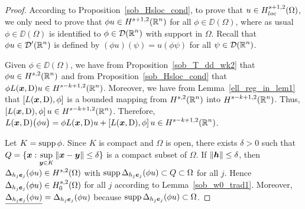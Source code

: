\begin{proof}
According to Proposition~\ref{sob_Hsloc_cond}, to prove that
$\displaystyle u \in H^{s+1,2}_{loc}(\Omega)$, we only need to prove that
$\displaystyle \phi u \in H^{s+1,2}(\mathbb{R}^n)$ for all $\phi\in \DD(\Omega)$,
where as usual $\phi \in \DD(\Omega)$ is identified to
$\displaystyle \phi \in \mathcal{D}(\mathbb{R}^n)$ with
support in $\Omega$.  Recall that $\displaystyle \phi  u \in \mathcal{D}'(\mathbb{R}^n)$ is
defined by $(\phi u)(\psi) = u(\phi \psi)$ for all
$\displaystyle \psi \in \mathcal{D}(\mathbb{R}^n)$.

Given $\phi \in \DD(\Omega)$, we have from
Proposition~\ref{sob_T_dd_wk2} that $\displaystyle \phi u \in H^{s,2}(\mathbb{R}^n)$
and from Proposition~\ref{sob_Hsloc_cond} that
$\displaystyle \phi L({\bm{x}},\operatorname{D}) u \in H^{s-k+1,2}(\mathbb{R}^n)$.
Moreover, we have from Lemma~\ref{ell_reg_in_lem1}
that $\left[ L({\bm{x}},\operatorname{D}), \phi\right]$ is a bounded mapping from
$\displaystyle H^{s,2}(\mathbb{R}^n)$ into $\displaystyle H^{s-k+1,2}(\mathbb{R}^n)$.
Thus,
$\displaystyle \left[ L({\bm{x}},\operatorname{D}), \phi\right]u \in H^{s-k+1,2}(\mathbb{R}^n)$.
Therefore,
$\displaystyle L({\bm{x}},\operatorname{D}) \big(\phi u\big) = \phi L({\bm{x}}, \operatorname{D}) u +
\left[ L({\bm{x}},\operatorname{D}), \phi\right] u \in H^{s-k+1,2}(\mathbb{R}^n)$.

Let $K = \operatorname{supp} \phi$.  Since $K$ is compact and $\Omega$ is open, there
exists $\delta >0$ such that
$\displaystyle Q = \{ {\bm{x}} :
\sup_{{\bm{y}} \in K} \|{\bm{x}} -{\bm{y}}\|\leq \delta \}$
is a compact subset of $\Omega$.  If $\|{\bm{h}}\| \leq \delta$, then
$\displaystyle \Delta_{h_j{\bm{e}}_j} (\phi u) \in H^{s,2}(\Omega)$
with $\operatorname{supp} \Delta_{h_j{\bm{e}}_j} (\phi u) \subset Q
\subset \Omega$ for all $j$.  Hence
$\displaystyle \Delta_{h_j{\bm{e}}_j} (\phi u) \in H^{s,2}_0(\Omega)$
for all $j$ according to Lemma~\ref{sob_w0_trad1}.  Moreover,
$\underline{\Delta_{h_j{\bm{e}}_j} (\phi u)}
= \Delta_{h_j{\bm{e}}_j} (\phi u)$ because
$\operatorname{supp} \Delta_{h_j{\bm{e}}_j} (\phi u)\subset \Omega$.


\end{proof}
